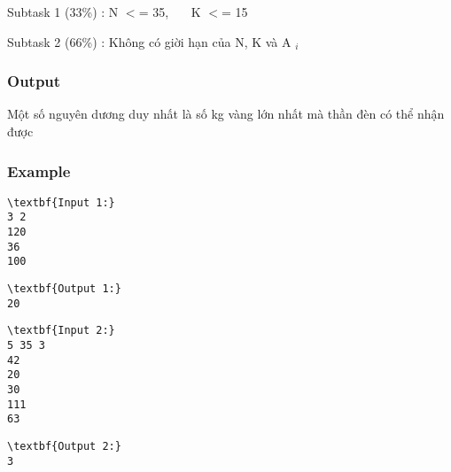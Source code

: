 Subtask 1 (33\%) : N $<$= 35,    K $<$= 15

Subtask 2 (66\%) : Không có giời hạn của N, K và A $_ i $

\subsubsection{Output}

Một số nguyên dương duy nhất là số kg vàng lớn nhất mà thần đèn có thể nhận được

\subsubsection{Example}
\begin{verbatim}
\textbf{Input 1:}
3 2
120
36
100\end{verbatim}
\begin{verbatim}
\textbf{Output 1:}
20\end{verbatim}
\begin{verbatim}
\textbf{Input 2:}
5 35 3
42
20
30
111
63\end{verbatim}
\begin{verbatim}
\textbf{Output 2:}
3
\end{verbatim}